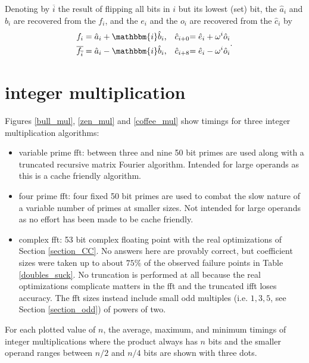 \documentclass[12 pt]{amsart}
\newcommand{\ii}[0] {\mathbbm{i}}
\begin{document}
Denoting by $\overline{i}$ the result of flipping all bits in $i$ but its lowest (set) bit, the $\hat{a}_i$ and $\hat{b}_i$ are recovered from the $f_i$, and the $e_i$ and
the $o_i$ are recovered from the $\hat{c}_i$ by
\begin{equation*}
\begin{alignedat}{6}
f_{i} &= \hat{a}_i + \ii \hat{b}_i&\text{,}& \quad \hat{c}_{i+0} &= \hat{e}_i + \omega^i \hat{o}_i\\
\overline{f_{\overline{i}}} &= \hat{a}_i - \ii \hat{b}_i &\text{,}& \quad \hat{c}_{i+8} &= \hat{e}_i - \omega^i \hat{o}_i
\end{alignedat}
\text{.}
\end{equation*}

\section{integer multiplication}
\label{section_mul}

Figures \ref{bull_mul}, \ref{zen_mul} and \ref{coffee_mul} show timings for
three integer multiplication algorithms:

\begin{itemize}
\item{variable prime fft: between three and nine 50 bit primes are used along
with a truncated recursive matrix Fourier algorithm. Intended for large
operands as this is a cache friendly algorithm.}
\item{four prime fft: four fixed 50 bit primes are used to combat the slow
nature of a variable number of primes at smaller sizes. Not intended for large
operands as no effort has been made to be cache friendly.}
\item{complex fft: 53 bit complex floating point with the real optimizations of
Section \ref{section_CC}. No answers here are provably correct, but coefficient
sizes were taken up to about $75\%$ of the observed failure points in
Table \ref{doubles_suck}. No truncation is performed at all because the real
optimizations complicate matters in the fft and the truncated ifft loses
accuracy. The fft sizes instead include small odd multiples
(i.e. $1,3,5$, see Section \ref{section_odd}) of powers of two.}
\end{itemize}
For each plotted value of $n$, the average, maximum, and minimum timings of 
integer multiplications where the product always has $n$ bits and the
smaller operand ranges between $n/2$ and $n/4$ bits are shown with three dots.
\end{document}

